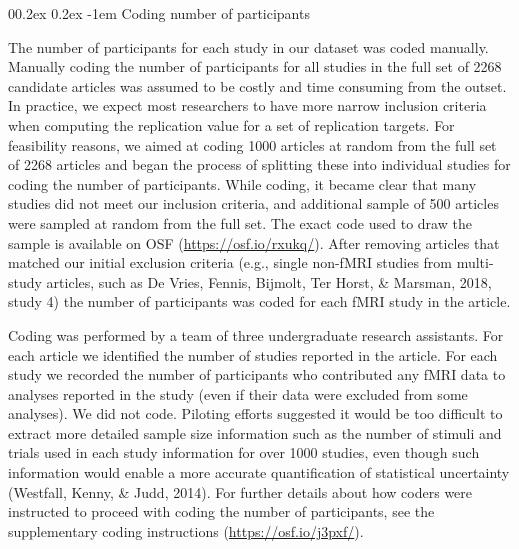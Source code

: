 \documentclass[
  man,floatsintext]{apa6}
\makeatletter
\let\oldparagraph\paragraph
\renewcommand{\paragraph}[1]{\oldparagraph{#1}\mbox{}}
\renewcommand{\paragraph}{\@startsection{paragraph}{4}{\parindent}%
  {0\baselineskip \@plus 0.2ex \@minus 0.2ex}%
  {-1em}%
  {\normalfont\normalsize\bfseries\itshape\typesectitle}}
\makeatother
\begin{document}
\hypertarget{coding-number-of-participants}{%
\paragraph{Coding number of participants}\label{coding-number-of-participants}}

The number of participants for each study in our dataset was coded manually. Manually coding the number of participants for all studies in the full set of 2268 candidate articles was assumed to be costly and time consuming from the outset. In practice, we expect most researchers to have more narrow inclusion criteria when computing the replication value for a set of replication targets. For feasibility reasons, we aimed at coding 1000 articles at random from the full set of 2268 articles and began the process of splitting these into individual studies for coding the number of participants. While coding, it became clear that many studies did not meet our inclusion criteria, and additional sample of 500 articles were sampled at random from the full set. The exact code used to draw the sample is available on OSF (\url{https://osf.io/rxukq/}). After removing articles that matched our initial exclusion criteria (e.g., single non-fMRI studies from multi-study articles, such as De Vries, Fennis, Bijmolt, Ter Horst, \& Marsman, 2018, study 4) the number of participants was coded for each fMRI study in the article.

Coding was performed by a team of three undergraduate research assistants. For each article we identified the number of studies reported in the article. For each study we recorded the number of participants who contributed any fMRI data to analyses reported in the study (even if their data were excluded from some analyses). We did not code. Piloting efforts suggested it would be too difficult to extract more detailed sample size information such as the number of stimuli and trials used in each study information for over 1000 studies, even though such information would enable a more accurate quantification of statistical uncertainty (Westfall, Kenny, \& Judd, 2014). For further details about how coders were instructed to proceed with coding the number of participants, see the supplementary coding instructions (\url{https://osf.io/j3pxf/}).
\end{document}
